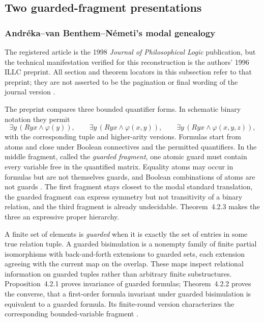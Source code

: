 
\subsection{Two guarded-fragment presentations}
\label{sec:p09-presentation-n-c-007}

\subsubsection{Andr\'eka--van Benthem--N\'emeti's modal genealogy}

The registered article is the 1998 \emph{Journal of Philosophical Logic}
publication, but the technical manifestation verified for this reconstruction
is the authors' 1996 ILLC preprint.  All section and theorem locators in this
subsection refer to that preprint; they are not asserted to be the pagination
or final wording of the journal version \cite{AndrekaVanBenthemNemeti1998}.

The preprint compares three bounded quantifier forms.  In schematic binary
notation they permit
\[
 \exists y\,(Ryx\land\varphi(y)),
 \qquad
 \exists y\,(Ryx\land\varphi(x,y)),
 \qquad
 \exists y\,(Ryx\land\varphi(x,y,z)),
\]
with the corresponding tuple and higher-arity versions.  Formulas start from
atoms and close under Boolean connectives and the permitted quantifiers.  In
the middle fragment, called the \emph{guarded fragment}, one atomic guard must
contain every variable free in the quantified matrix.  Equality atoms may
occur in formulas but are not themselves guards, and Boolean combinations of
atoms are not guards \cite[\S4.1]{AndrekaVanBenthemNemeti1998}.  The first
fragment stays closest to the modal standard translation, the guarded fragment
can express symmetry but not transitivity of a binary relation, and the third
fragment is already undecidable.  Theorem~4.2.3 makes the three an expressive
proper hierarchy.

A finite set of elements is \emph{guarded} when it is exactly the set of
entries in some true relation tuple.  A guarded bisimulation is a nonempty
family of finite partial isomorphisms with back-and-forth extensions to guarded
sets, each extension agreeing with the current map on the overlap.  These maps
inspect relational information on guarded tuples rather than arbitrary finite
substructures.  Proposition~4.2.1 proves invariance of guarded formulas;
Theorem~4.2.2 proves the converse, that a first-order formula invariant under
guarded bisimulation is equivalent to a guarded formula.  Its finite-round
version characterizes the corresponding bounded-variable fragment
\cite[\S4.2]{AndrekaVanBenthemNemeti1998}.

